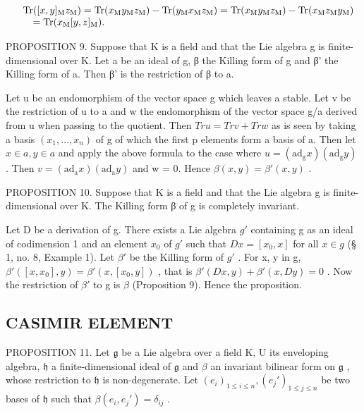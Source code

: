 \[
\begin{array}{r l} & {\mathrm{Tr} ([ x, y ] _ {\mathrm{M}} z _ {\mathrm{M}}) = \mathrm{Tr} (x _ {\mathrm{M}} y _ {\mathrm{M}} z _ {\mathrm{M}}) - \mathrm{Tr} (y _ {\mathrm{M}} x _ {\mathrm{M}} z _ {\mathrm{M}}) = \mathrm{Tr} (x _ {\mathrm{M}} y _ {\mathrm{M}} z _ {\mathrm{M}}) - \mathrm{Tr} (x _ {\mathrm{M}} z _ {\mathrm{M}} y _ {\mathrm{M}})} \\ & {\quad = \mathrm{Tr} (x _ {\mathrm{M}} [ y, z ] _ {\mathrm{M}}).} \end{array}
\]

PROPOSITION 9. Suppose that K is a field and that the Lie algebra g is finite-dimensional over K. Let a be an ideal of g, β the Killing form of g and β' the Killing form of a. Then β' is the restriction of β to a.

Let u be an endomorphism of the vector space g which leaves a stable. Let v be the restriction of u to a and w the endomorphism of the vector space g/a derived from u when passing to the quotient. Then \(Tr u = Tr v + Tr w\) as is seen by taking a basis \((x_{1}, \ldots, x_{n})\) of g of which the first p elements form a basis of a. Then let \(x \in a, y \in a\) and apply the above formula to the case where \(u = (\mathrm{ad}_{\mathrm{g}} x)(\mathrm{ad}_{\mathrm{g}} y)\) . Then \(v = (\mathrm{ad}_{\mathrm{a}} x)(\mathrm{ad}_{\mathrm{a}} y)\) and w = 0. Hence \(\beta(x, y) = \beta'(x, y)\) .

PROPOSITION 10. Suppose that K is a field and that the Lie algebra g is finite-dimensional over K. The Killing form β of g is completely invariant.

Let D be a derivation of g. There exists a Lie algebra \(g'\) containing g as an ideal of codimension 1 and an element \(x_{0}\) of \(g'\) such that \(Dx = [x_{0}, x]\) for all \(x \in g\) (§ 1, no. 8, Example 1). Let \(\beta'\) be the Killing form of \(g'\) . For x, y in g, \(\beta'([x, x_{0}], y) = \beta'(x, [x_{0}, y])\) , that is \(\beta'(Dx, y) + \beta'(x, Dy) = 0\) . Now the restriction of \(\beta'\) to g is \(\beta\) (Proposition 9). Hence the proposition.

\subsection{CASIMIR ELEMENT}

PROPOSITION 11. Let \(\mathfrak{g}\) be a Lie algebra over a field K, U its enveloping algebra, \(\mathfrak{h}\) a finite-dimensional ideal of \(\mathfrak{g}\) and \(\beta\) an invariant bilinear form on \(\mathfrak{g}\) , whose restriction to \(\mathfrak{h}\) is non-degenerate. Let \((e_i)_{1\leqslant i\leqslant n}, (e_j')_{1\leqslant j\leqslant n}\) be two bases of \(\mathfrak{h}\) such that \(\beta(e_i,e_j') = \delta_{ij}\) .

